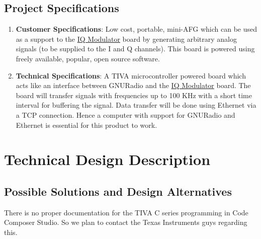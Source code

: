 \documentclass{article}
\begin{document}
\subsection{Project Specifications}
\begin{enumerate}
\item \textbf{Customer Specifications}: Low cost, portable, mini-AFG which can be used as a support to the \href{http://wel.ee.iitb.ac.in/teaching_labs/Communication/index.html}{IQ Modulator} board by generating arbitrary analog signals (to be supplied to the I and Q channels). This board is powered using freely available, popular, open source software.
\item \textbf{Technical Specifications}: 
  A TIVA microcontroller powered board which acts like an
interface between GNURadio and the \href{http://wel.ee.iitb.ac.in/teaching_labs/Communication/index.html}{IQ Modulator} board. The board will transfer signals with frequencies up to 100 KHz with a short time interval for buffering the signal. Data transfer will be done using Ethernet via a TCP connection. Hence a computer with support for GNURadio and Ethernet is essential for this product to work.
\end{enumerate}

\section{Technical Design Description}
\subsection{Possible Solutions and Design Alternatives}
There is no proper documentation for the TIVA C series programming in Code Composer Studio. So we plan to contact the Texas Instruments guys regarding this. 
\end{document}
